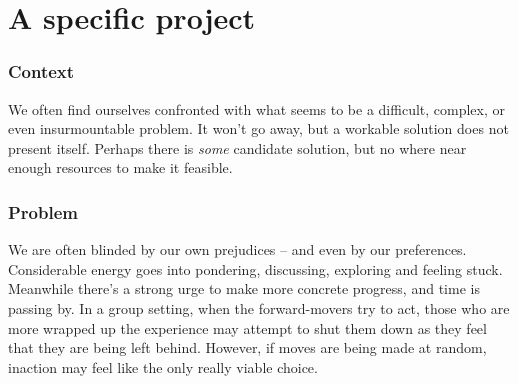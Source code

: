 \begingroup \color{BurntOrange}

\section{A specific project}\label{sec:A_specific_project}
\subsubsection*{Context}
We often find ourselves confronted with what seems to be a difficult, complex, or even insurmountable problem.  It won't go away, but a workable solution does not present itself.  Perhaps there is \emph{some} candidate solution, but no where near enough resources to make it feasible.  

\subsubsection*{Problem}
We are often blinded by our own prejudices -- and even by our preferences.  Considerable energy goes into pondering, discussing, exploring and feeling stuck.  Meanwhile there's a strong urge to make more concrete progress, and time is passing by.  In a group setting, when the forward-movers try to act, those who are more wrapped up the experience may attempt to shut them down as they feel that they are being left behind.  However, if moves are being made at random, inaction may feel like the only really viable choice.

